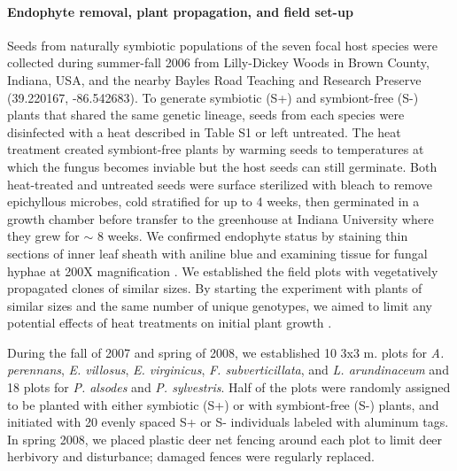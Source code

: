 \documentclass[12pt]{article}
\begin{document}
\paragraph*{Endophyte removal, plant propagation, and field set-up}
Seeds from naturally symbiotic populations of the seven focal host species were collected during summer-fall 2006 from Lilly-Dickey Woods in Brown County, Indiana, USA, and the nearby Bayles Road Teaching and Research Preserve (39.220167, -86.542683). 
To generate symbiotic (S+) and symbiont-free (S-) plants that shared the same genetic lineage, seeds from each species were disinfected with a heat described in Table S1 or left untreated. 
The heat treatment created symbiont-free plants by warming seeds to temperatures at which the fungus becomes inviable but the host seeds can still germinate.
Both heat-treated and untreated seeds were surface sterilized with bleach to remove epichyllous microbes, cold stratified for up to 4 weeks, then germinated in a growth chamber before transfer to the greenhouse at Indiana University where they grew for $\sim$ 8 weeks. 
We confirmed endophyte status by staining thin sections of inner leaf sheath with aniline blue and examining tissue for fungal hyphae at 200X magnification \cite{bacon2018stains}. 
We established the field plots with vegetatively propagated clones of similar sizes. 
By starting the experiment with plants of similar sizes and the same number of unique genotypes, we aimed to limit any potential effects of heat treatments on initial plant growth \cite{rudgers2009benefits}.

During the fall of 2007 and spring of 2008, we established 10 3x3 m. plots for \emph{A. perennans}, \emph{E. villosus}, \emph{E. virginicus}, \emph{F. subverticillata}, and \emph{L. arundinaceum}  and 18 plots for \emph{P. alsodes} and \emph{P. sylvestris}.
Half of the plots were randomly assigned to be planted with either symbiotic (S+) or with symbiont-free (S-) plants, and initiated with 20 evenly spaced S+ or S- individuals labeled with aluminum tags.
In spring 2008, we placed plastic deer net fencing around each plot to limit deer herbivory and disturbance; damaged fences were regularly replaced.
\end{document}
